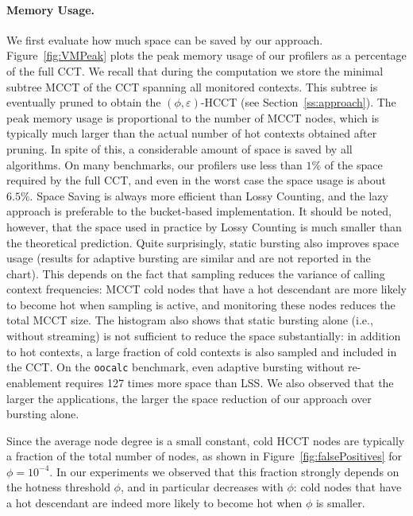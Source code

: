 \documentclass{sigplanconf}
\begin{document}
\paragraph{Memory Usage.} We first evaluate how much space can be saved by our approach. Figure~\ref{fig:VMPeak} plots the peak memory usage of our profilers as a percentage of the full CCT. We recall that during the computation we store the minimal subtree MCCT of the CCT spanning all monitored contexts. This subtree is eventually pruned to obtain the $(\phi,\varepsilon)$-HCCT (see Section~\ref{ss:approach}). The peak memory usage is proportional to the number of MCCT nodes, which is typically much larger than the actual number of hot contexts obtained after pruning. 
In spite of this, a considerable amount of space is saved by all algorithms. On many benchmarks, our profilers use less than $1\%$ of the space required by the full CCT, and even in the worst case the space usage is about $6.5\%$. Space Saving is always more efficient than Lossy Counting, and the lazy approach is preferable to the bucket-based implementation. It should be noted, however, that the space used in practice by Lossy Counting is much smaller than the theoretical prediction. Quite surprisingly, static bursting also improves space usage (results for adaptive bursting are similar and are not reported in the chart). This depends on the fact that sampling reduces the variance of calling context frequencies: MCCT cold nodes that have a hot descendant are more likely to become hot when sampling is active, and monitoring these nodes reduces the total MCCT size. The histogram also shows that static bursting alone (i.e., without streaming) is not sufficient to reduce the space substantially: in addition to hot contexts, a large fraction of cold contexts is also sampled and included in the CCT. On the {\tt oocalc} benchmark, even adaptive bursting without re-enablement requires 127 times more space than LSS. We also observed that the larger the applications, the larger the space reduction of our approach over bursting alone.

Since the average node degree is a small constant, cold HCCT nodes are typically a fraction of the total number of nodes, as shown in Figure~\ref{fig:falsePositives} for $\phi=10^{-4}$. In our experiments we observed that this fraction strongly depends on the  hotness threshold $\phi$, and in particular decreases with $\phi$: cold nodes that have a hot descendant are indeed more likely to become hot when $\phi$ is smaller.
\end{document}
